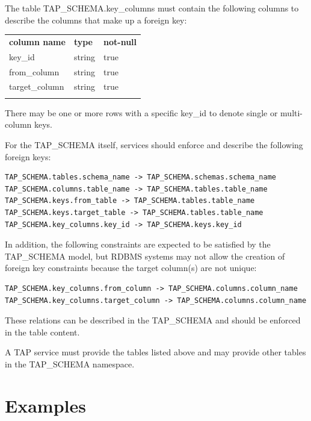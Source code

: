 \documentclass[11pt,letter]{ivoa}
\newcommand{\tapschema}{TAP\_SCHE\-MA}
\newcommand{\tapschema}{\mbox{%
  \relsize{-0.5}TAP\discretionary{-}{}{\kern-2pt\_}SCHEMA}}
\begin{document}
The table \tapschema.key\_columns must contain the 
following columns to describe the col\-umns that make up a foreign key:

\begin{inlinetable}
\begin{tabular}{l l l}
\sptablerule
\textbf{column name} & \textbf{type} & \textbf{not-null} \\
\sptablerule
key\_id & string & true \\
from\_column & string & true \\
target\_column & string & true \\
\sptablerule
\end{tabular}
\end{inlinetable}

There may be one or more rows with a specific key\_id to 
denote single or multi-column keys.

For the \tapschema{} itself, services should enforce and describe the following foreign keys:

\begin{verbatim}
TAP_SCHEMA.tables.schema_name -> TAP_SCHEMA.schemas.schema_name
TAP_SCHEMA.columns.table_name -> TAP_SCHEMA.tables.table_name
TAP_SCHEMA.keys.from_table -> TAP_SCHEMA.tables.table_name
TAP_SCHEMA.keys.target_table -> TAP_SCHEMA.tables.table_name
TAP_SCHEMA.key_columns.key_id -> TAP_SCHEMA.keys.key_id
\end{verbatim}

In addition, the following constraints are expected to be satisfied by the \tapschema{} model, but 
RDBMS systems may not allow the creation of foreign key constraints because the target column(s) 
are not unique:

\begin{verbatim}
TAP_SCHEMA.key_columns.from_column -> TAP_SCHEMA.columns.column_name
TAP_SCHEMA.key_columns.target_column -> TAP_SCHEMA.columns.column_name
\end{verbatim}

These relations can be described in the \tapschema{} and should be enforced in the table content.

A TAP service must provide the tables listed above and may provide other tables 
in the \tapschema{} namespace.


\section{Examples}
\label{sec:examples}
\end{document}
